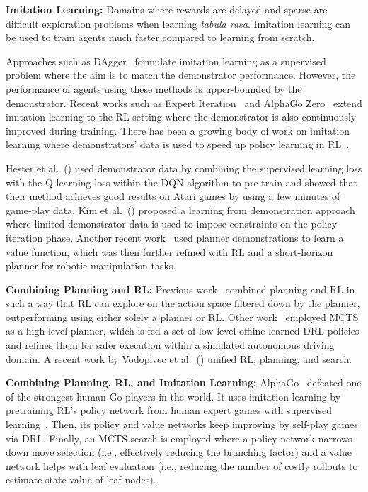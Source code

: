 \documentclass[letterpaper]{article}
\begin{document}
\textbf{Imitation Learning:} Domains where rewards are delayed and sparse are difficult exploration problems when learning \textit{tabula rasa}. Imitation learning can be used to train agents much faster compared to learning from scratch.

Approaches such as DAgger~\cite{ross2011reduction} formulate imitation learning as a supervised problem where the aim is to match the demonstrator performance. However, the performance of agents using these methods is upper-bounded by the demonstrator. Recent works such as Expert Iteration~\cite{anthony2017thinking} and AlphaGo Zero~\cite{silver2017mastering} extend imitation learning to the RL setting where the demonstrator is also continuously improved during training. There has been a growing body of work on imitation learning where demonstrators' data is used to speed up policy learning in RL~\cite{hester2017deep}.

Hester et al.~(\citeyear{hester2017deep}) used demonstrator data by combining the supervised learning loss with the Q-learning loss within the DQN algorithm to pre-train and showed that their method achieves good results on Atari games by using a few minutes of game-play data. Kim et al.~(\citeyear{kim2013learning}) proposed a learning from demonstration approach where limited demonstrator data is used to impose constraints on the policy iteration phase. Another recent work~\cite{bejjani2018planning} used planner demonstrations to learn a value function, which was then further refined with RL and a short-horizon planner for robotic manipulation tasks.

\textbf{Combining Planning and RL:} Previous work~\cite{leonetti2016synthesis} combined planning and RL in such a way that RL can explore on the action space filtered down by the planner, outperforming using either solely a planner or RL. Other work~\cite{lee2019wisemove} employed MCTS as a high-level planner, which is fed a set of low-level offline learned DRL policies and refines them for safer execution within a simulated autonomous driving domain. A recent work by Vodopivec et al.~(\citeyear{vodopivec2017monte}) unified RL, planning, and search.

\textbf{Combining Planning, RL, and Imitation Learning:} AlphaGo~\cite{silver2016mastering} defeated one of the strongest human Go players in the world. It uses imitation learning by pretraining RL's policy network from human expert games with supervised learning~\cite{lecun2015deep}. Then, its policy and value networks keep improving by self-play games via DRL. Finally, an MCTS search is employed where a policy network narrows down move selection (i.e., effectively reducing the branching factor) and a value network helps with leaf evaluation (i.e., reducing the number of costly rollouts to estimate state-value of leaf nodes).
\end{document}

